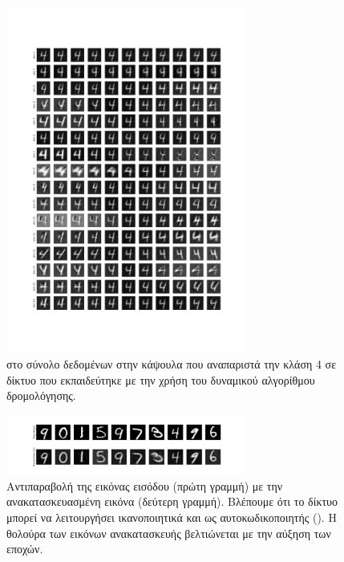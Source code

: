 \begin{figure}[h]
    \centering
    \includegraphics[width=0.7\textwidth]{images/chapter experiments/method 1/image 6/perturbations_19.png}
    \caption{ στο σύνολο δεδομένων  στην κάψουλα  που αναπαριστά την κλάση 4 σε δίκτυο που εκπαιδεύτηκε με την χρήση του δυναμικού αλγορίθμου δρομολόγησης.}
    \label{fig:exp_method_1_special_perturb_1}
  \end{figure}

\begin{figure}[h]
    \centering
    \includegraphics[width=0.7\textwidth]{images/chapter experiments/method 1/image 6/original_vs_reconstruction.pdf}
    \caption{Αντιπαραβολή της εικόνας εισόδου (πρώτη γραμμή) με την ανακατασκευασμένη εικόνα (δεύτερη γραμμή). Βλέπουμε ότι το δίκτυο μπορεί να λειτουργήσει ικανοποιητικά και ως αυτοκωδικοποιητής (). Η θολούρα των εικόνων ανακατασκευής βελτιώνεται με την αύξηση των εποχών.}
    \label{fig:exp_method_1_special_perturb_many_1}
  \end{figure}

